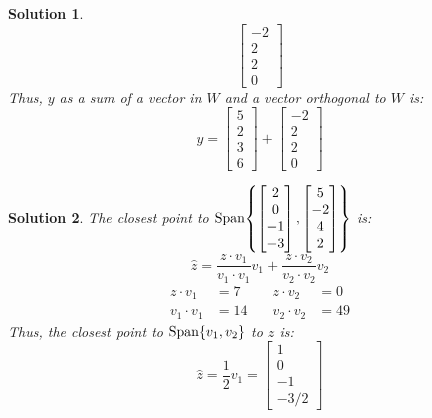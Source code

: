 \documentclass[11pt]{scrartcl}
\theoremstyle{dotlessP}
\newtheorem{sol}{Solution}[section]
\theoremstyle{dotlessN}
\DeclarePairedDelimiter\set{\{}{\}}
\newcommand{\spa}[1]{\text{Span}\set*{#1}}
\begin{document}
\begin{sol}
\[\begin{bmatrix}
		-2 \\
		2 \\
		2 \\
		0
	\end{bmatrix}
	\] 
	Thus, $y$ as a sum of a vector in $W$ and a vector orthogonal to $W$ is:
	\[
	y = 
	\begin{bmatrix}
		5 \\
		2 \\
		3 \\
		6
	\end{bmatrix} +
	\begin{bmatrix}
		-2 \\
		2 \\
		2 \\
		0
	\end{bmatrix}
	\] 
\end{sol}
\begin{sol}
	The closest point to $\spa{
\begin{bmatrix}
	2 \\
	0 \\
	-1 \\
	-3
\end{bmatrix},
\begin{bmatrix}
	5 \\
	-2 \\
	4 \\
	2
\end{bmatrix}
	}$ is:
	\[
		\hat{z} = \frac{z \cdot v_1}{v_1\cdot v_1}v_1 + \frac{z \cdot v_2}{v_2 \cdot v_2}v_2
	\] 
	\begin{align*}
		z \cdot v_1 &= 7 &\quad z \cdot v_2 &= 0 \\
		v_1 \cdot v_1 &= 14 &\quad v_2 \cdot v_2 &= 49
	\end{align*}
	Thus, the closest point to $\spa{v_1, v_2}$ to $z$ is:
	 \[
		 \hat{z} = \frac{1}{2}v_1 = 
		 \begin{bmatrix}
		 	1 \\
			0 \\
			-1 \\
			-3/2
		 \end{bmatrix}
	\] 
\end{sol}
\end{document}
